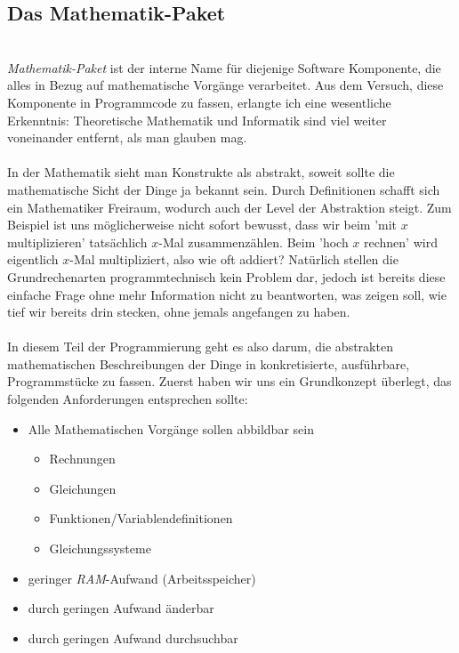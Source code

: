\subsection{Das Mathematik-Paket}\ \\
\textit{Mathematik-Paket} ist der interne Name für diejenige Software Komponente, die alles in Bezug auf mathematische Vorgänge verarbeitet. Aus dem Versuch, diese Komponente in Programmcode zu fassen, erlangte ich eine wesentliche Erkenntnis: Theoretische Mathematik und Informatik sind viel weiter voneinander entfernt, als man glauben mag.\\\\
In der Mathematik sieht man Konstrukte als abstrakt, soweit sollte die mathematische Sicht der Dinge ja bekannt sein. Durch Definitionen schafft sich ein Mathematiker Freiraum, wodurch auch der Level der Abstraktion steigt. Zum Beispiel ist uns möglicherweise nicht sofort bewusst, dass wir beim 'mit $x$ multiplizieren' tatsächlich $x$-Mal zusammenzählen. Beim 'hoch $x$ rechnen' wird eigentlich $x$-Mal multipliziert, also wie oft addiert? Natürlich stellen die Grundrechenarten programmtechnisch kein Problem dar, jedoch ist bereits diese einfache Frage ohne mehr Information nicht zu beantworten, was zeigen soll, wie tief wir bereits drin stecken, ohne jemals angefangen zu haben.\\\\
In diesem Teil der Programmierung geht es also darum, die abstrakten mathematischen Beschreibungen der Dinge in konkretisierte, ausführbare, Programmstücke zu fassen. Zuerst haben wir uns ein Grundkonzept überlegt, das folgenden Anforderungen entsprechen sollte:\\
\begin{itemize}
	\item Alle Mathematischen Vorgänge sollen abbildbar sein
	\begin{itemize}
		\item Rechnungen
		\item Gleichungen
		\item Funktionen/Variablendefinitionen
		\item Gleichungssysteme
	\end{itemize}
	\item geringer \textit{RAM}-Aufwand (Arbeitsspeicher)
	\item durch geringen Aufwand änderbar
	\item durch geringen Aufwand durchsuchbar
\end{itemize}
